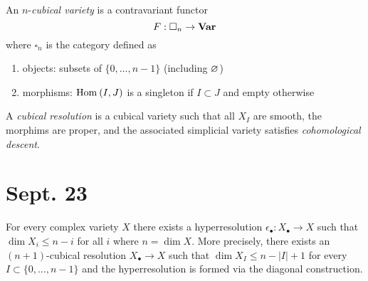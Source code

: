 \documentclass[12pt]{article}
\begin{document}
\begin{defn}
An $n$-\textit{cubical variety} is a contravariant functor 
\[ F : \square_n \to \mathbf{Var} \]
where $\square_n$ is the category defined as
\begin{enumerate}
\item objects: subsets of $\{ 0, \dots, n - 1\}$ (including $\varnothing$)
\item morphisms: $\mathrm{Hom}_{} \left( I, J \right)$ is a singleton if $I \subset J$ and empty otherwise
\end{enumerate}
\end{defn}

\begin{defn}
A \textit{cubical resolution} is a cubical variety such that all $X_I$ are smooth, the morphims are proper, and the associated simplicial variety satisfies \textit{cohomological descent}. 
\end{defn}

\section{Sept. 23}

\newcommand{\parallelto}{\rightrightarrows}

\begin{theorem}[GNPP]
For every complex variety $X$ there exists a hyperresolution $\epsilon_\bullet : X_\bullet \to X$ such that $\dim{X_i} \le n - i$ for all $i$ where $n = \dim{X}$. More precisely, there exists an $(n+1)$-cubical resolution $X_\bullet \to X$ such that $\dim{X_I} \le n - |I| + 1$ for every $I \subset \{ 0, \dots, n-1\}$ and the hyperresolution is formed via the diagonal construction. 
\end{theorem}
\end{document}
